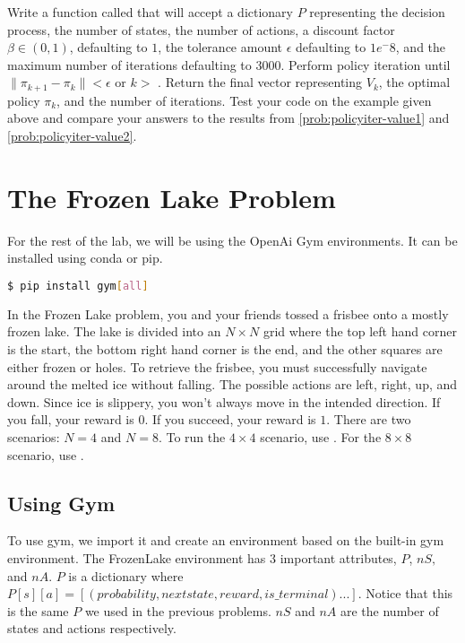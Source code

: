 \begin{problem}
\label{prob:policyiter-value4}
Write a function called  that will accept a dictionary $P$ representing the decision process, the number of states, the number of actions, a discount factor $\beta \in (0,1)$, defaulting to $1$, the tolerance amount $\epsilon$ defaulting to $1e^-8$, and the maximum number of iterations  defaulting to $3000$.
Perform policy iteration until $\|\pi_{k+1} - \pi_{k}\| < \epsilon$ or $k > $ .
Return the final vector representing $V_k$, the optimal policy $\pi_k$, and the number of iterations.
Test your code on the example given above and compare your answers to the results from \ref{prob:policyiter-value1} and \ref{prob:policyiter-value2}.
\end{problem}



\section*{The Frozen Lake Problem}
For the rest of the lab, we will be using the OpenAi Gym environments.
It can be installed using conda or pip.
\begin{lstlisting}[language=Bash]
$ pip install gym[all]
\end{lstlisting}


In the Frozen Lake problem, you and your friends tossed a frisbee onto a mostly frozen lake.
The lake is divided into an $N \times N$ grid where the top left hand corner is the start, the bottom right hand corner is the end, and the other squares are either frozen or holes.
To retrieve the frisbee, you must successfully navigate around the melted ice without falling.
The possible actions are left, right, up, and down.
Since ice is slippery, you won't always move in the intended direction.
If you fall, your reward is $0$.
If you succeed, your reward is $1$.
There are two scenarios: $N=4$ and $N=8$.
To run the $4\times 4$ scenario, use .
For the $8\times 8$ scenario, use .

\subsection*{Using Gym}
To use gym, we import it and create an environment based on the built-in gym environment.
The FrozenLake environment has $3$ important attributes, $P$, $nS,$ and $nA$.
$P$ is a dictionary where $P[s][a]=[(probability, nextstate, reward, is\_terminal)...]$.
Notice that this is the same $P$ we used in the previous problems.
$nS$ and $nA$ are the number of states and actions respectively.

